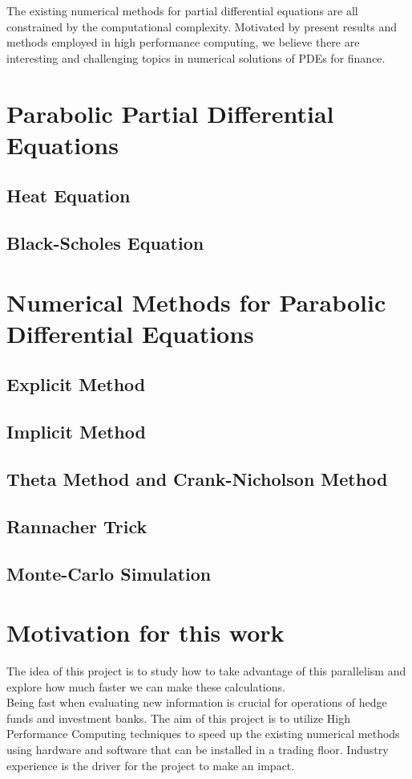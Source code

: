 \documentclass[12pt, oneside]{book}
\theoremstyle{plain}
\theoremstyle{definition}
\begin{document}
The existing numerical methods for partial differential equations are all constrained by the computational complexity. Motivated by present results and methods employed in high performance computing, we believe there are interesting and challenging topics in numerical solutions of PDEs for finance.

\section{Parabolic Partial Differential Equations}\label{Parabolic Partial Differential Equations}

\subsection{Heat Equation}

\subsection{Black-Scholes Equation}

\section{Numerical Methods for Parabolic Differential Equations}

\subsection{Explicit Method}

\subsection{Implicit Method}

\subsection{Theta Method and Crank-Nicholson Method}

\subsection{Rannacher Trick}

\subsection{Monte-Carlo Simulation}


\section{Motivation for this work}
The idea of this project is to study how to take advantage of this parallelism and explore how much faster we can make these calculations.
\\
Being fast when evaluating new information is crucial for operations of hedge funds and investment banks. The aim of this project is to utilize High Performance Computing techniques to speed up the existing numerical methods using hardware and software that can be installed in a trading floor. Industry experience is the driver for the project to make an impact.
\end{document}
